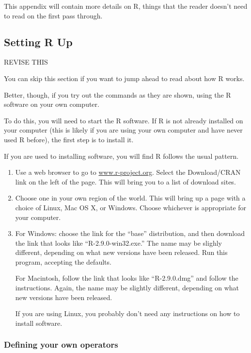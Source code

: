 This appendix will contain more details on R, things that the reader doesn't need to read on the first pass through.


\label{chap:more-about-r}

\subsection{Setting R Up}

REVISE THIS

\label{sec:setting-r-up}
You can skip this section if you want to jump ahead to read about how R works. 


Better, though, if you try out the commands as they are shown, using
the R software on your own computer. 

To do this, you will need to start the R software.  If R is not
already installed on your computer (this is likely if you are using
your own computer and have never used R before), the first step is to
install it. 

If you are used to installing software, you will find R follows the
usual pattern.  
\begin{enumerate}
\item Use a web browser to go to \url{www.r-project.org}. Select
the Download/CRAN link on the left of the page. This will bring you to
a list of download sites.

\item  Choose one in your own region of the
world.  This will bring up a page with a choice of Linux, Mac OS X, or
Windows.  Choose whichever is appropriate for your computer.

\item  For Windows: choose the link for the ``base'' distribution, and
  then download the link that looks like ``R-2.9.0-win32.exe.''  The
  name may be slighly different, depending on what new versions have
  been released.  Run this program, accepting the defaults.

  For Macintosh, follow the link that looks like ``R-2.9.0.dmg'' and
  follow the instructions.  Again, the name may be slightly different,
  depending on what new versions have been released.

  If you are using Linux, you probably don't need any instructions on
  how to install software.
\end{enumerate}  

\subsubsection{Defining your own operators}

